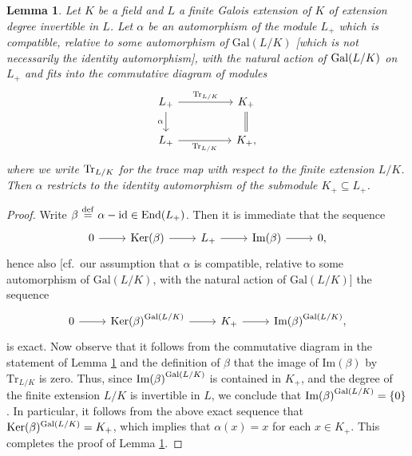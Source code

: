 \documentclass[12pt,showkeys]{amsart}
\theoremstyle{theorem}
\newtheorem{lem}[theorem]{Lemma}
\theoremstyle{definition}
\def\Ker{{\mbox{Ker}}}
\def\Im{{\mbox{Im}}}
\def\End{{\mbox{End}}}
\def\defeq{ \ {\stackrel{\mathrm{def}}{=}} \ }
\begin{document}
\begin{lem}\label{lemma:2.3}
Let $K$ be a field and $L$ a finite Galois extension of $K$ of extension degree invertible in $L$. Let $\alpha$ be an automorphism of the module $L_+$ which is compatible, relative to some automorphism of $\mathrm{Gal}(L/K)$ [which is not necessarily the identity automorphism], with the natural action of ${\rm Gal} (L/K)$ on $L_+$ and fits into the commutative diagram of modules 
\[
\begin{tikzcd}
L_{+} \arrow[rr, "{\rm Tr}_{L/K}"] \arrow[d, "\alpha"'] && K_+ \arrow[d, equal] \\
L_{+} \arrow[rr, "{\rm Tr}_{L/K}"']                         && K_+,                
\end{tikzcd}
\]
where we write ${\rm Tr}_{L/K}$ for the trace map with respect to the finite extension $L/K$. 
Then $\alpha$ restricts to the identity automorphism of the submodule $K_+ \subseteq L_+$.  
\end{lem}
\begin{proof}
Write $\beta \defeq \alpha - {\rm id} \in \End(L_+)$. Then it is immediate that the sequence 
\[
\begin{tikzcd}
0 \arrow[r] & \mbox{Ker}(\beta) \arrow[r] & L_{+} \arrow[r] & \mbox{Im}(\beta) \arrow[r] & 0, 
\end{tikzcd}
\]
hence also [cf.\ our assumption that $\alpha$ is compatible, relative to some automorphism of $\mathrm{Gal}(L/K)$, with the natural action of $\mathrm{Gal}(L / K)$] the sequence 
\[
\begin{tikzcd}
0 \arrow[r] & {\mbox{Ker}(\beta)}^{{\rm Gal}(L/K)} \arrow[r] & K_+ \arrow[r] & {\mbox{Im}(\beta)}^{{\rm Gal}(L/K)}, 
\end{tikzcd}
\]
is exact. 
Now observe that it follows from the commutative diagram in the statement of Lemma \ref{lemma:2.3} and the definition of $\beta$ that the image of $\Im(\beta)$ by $\mathrm{Tr}_{L / K}$ is zero. Thus, since ${\mbox{Im}(\beta)}^{{\rm Gal}(L/K)}$ is contained in $K_+$, and the degree of the finite extension $L / K$ is invertible in $L$, we conclude that ${\mbox{Im}(\beta)}^{{\rm Gal}(L/K)} = \{0\}$.  In particular, it follows from the above exact sequence that $\Ker(\beta)^{{\rm Gal}(L/K)} = K_{+}$, which implies that $\alpha(x) = x$ for each $x \in K_+$. This completes the proof of Lemma \ref{lemma:2.3}.  
\end{proof}
\end{document}
